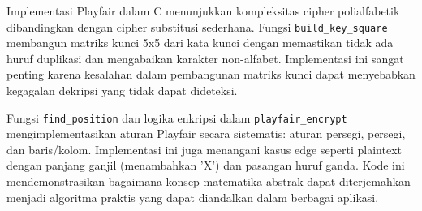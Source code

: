 Implementasi Playfair dalam C menunjukkan kompleksitas cipher polialfabetik dibandingkan dengan cipher substitusi sederhana. Fungsi \texttt{build\_key\_square} membangun matriks kunci 5x5 dari kata kunci dengan memastikan tidak ada huruf duplikasi dan mengabaikan karakter non-alfabet. Implementasi ini sangat penting karena kesalahan dalam pembangunan matriks kunci dapat menyebabkan kegagalan dekripsi yang tidak dapat dideteksi.

Fungsi \texttt{find\_position} dan logika enkripsi dalam \texttt{playfair\_encrypt} mengimplementasikan aturan Playfair secara sistematis: aturan persegi, persegi, dan baris/kolom. Implementasi ini juga menangani kasus edge seperti plaintext dengan panjang ganjil (menambahkan 'X') dan pasangan huruf ganda. Kode ini mendemonstrasikan bagaimana konsep matematika abstrak dapat diterjemahkan menjadi algoritma praktis yang dapat diandalkan dalam berbagai aplikasi.
